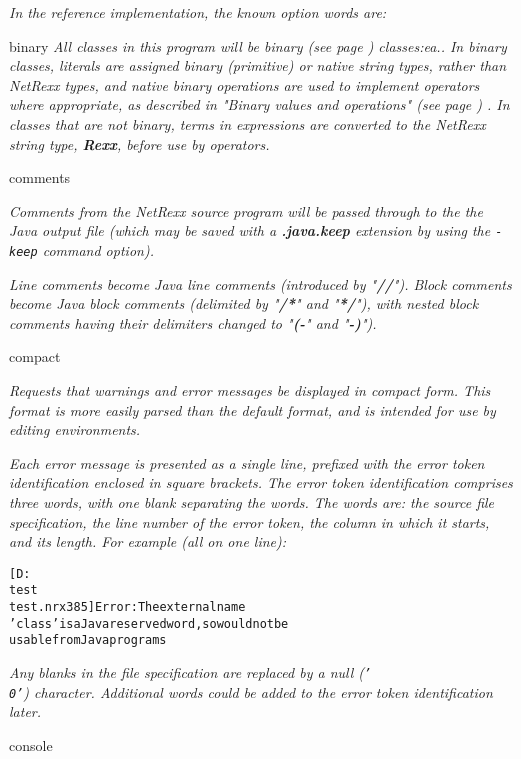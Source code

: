 \emph{In the reference implementation, the known option words are:}
\begin{description}
\item{binary}
\emph{All classes in this program will be  binary (see page \pageref{refbincla}) 
classes:ea..
In binary classes, literals are assigned binary (primitive) or native
string types, rather than NetRexx types, and native binary operations
are used to implement operators where appropriate, as described in
 "\emph{Binary values and operations}" (see page \pageref{refbinary}) .
In classes that are not binary, terms in expressions are converted to
the NetRexx string type, \textbf{Rexx}, before use by operators.}
\item{comments}

\emph{Comments from the NetRexx source program will be passed through to the
the Java output file (which may be saved with a \textbf{.java.keep}
extension by using the \texttt{-keep} command option).}
 
\emph{Line comments become Java line comments (introduced by
"\textbf{//}").
Block comments become Java block comments (delimited by
"\textbf{/*}" and "\textbf{*/}"), with nested block
comments having their delimiters changed to "\textbf{(-}" and
"\textbf{-)}").}
\item{compact}

\emph{Requests that warnings and error messages be displayed in compact
form.  This format is more easily parsed than the default format, and
is intended for use by editing environments.}
 
\emph{Each error message is presented as a single line, prefixed with the
error token identification enclosed in square brackets.
The error token identification comprises three words, with one blank
separating the words.  The words are: the source file specification, the
line number of the error token, the column in which it starts, and its
length.  For example (all on one line):}
\begin{alltt}
[D:\\test\\test.nrx 3 8 5] Error: The external name
'class' is a Java reserved word, so would not be
usable from Java programs
\end{alltt}
\emph{Any blanks in the file specification are replaced by a null
(\texttt{'\\0'}) character.  Additional words could be added to the error
token identification later.}
\item{console}


\end{description}
